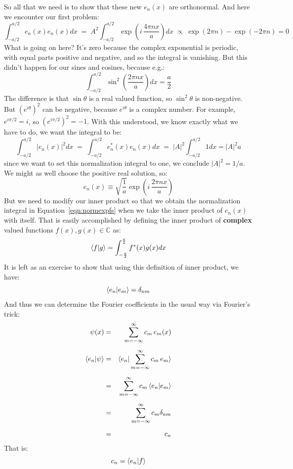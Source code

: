 \documentclass[12pt]{book}
\begin{document}
So all that we need is to show that these new $e_n(x)$ are orthonormal.  And here we encounter our first problem:
$$\int_{-a/2}^{a/2} e_n(x) e_n(x) dx \; = \; A^2 \int_{-a/2}^{a/2} \exp\left( i \, \frac{4 \pi n x}{a}\right) dx \; \propto \; \exp(2 \pi n) - \exp(-2 \pi n) = 0$$
What is going on here?  It's zero because the complex exponential is periodic, with equal parts positive and negative, and so the integral is vanishing.  But this didn't happen for our sines and cosines, because e.g.:
$$\int_{-a/2}^{a/2} \sin^2\left( \frac{2 \pi n x}{a}\right) dx = \frac{a}{2}$$
The difference is that $\sin\theta$ is a real valued function, so $\sin^2\theta$ is non-negative.  But $(e^{i\theta})^2$ can be negative, because $e^{i\theta}$ is a complex number. For example, $e^{i\pi/2} = i$, so $\left( e^{i\pi/2} \right)^2 = -1$.  With this understood, we know exactly what we have to do, we want the integral to be:
\begin{equation}
\label{eqn:normexpfs}
\int_{-a/2}^{a/2} |e_n(x)|^2 dx \; = \; \int_{-a/2}^{a/2} e_n^*(x) e_n(x) dx \; = \;
|A|^2 \int_{-a/2}^{a/2} 1 dx = |A|^2 a
\end{equation}
since we want to set this normalization integral to one, we conclude $|A|^2=1/a$.  We might as well choose the positive real solution, so:
\begin{equation}
e_n(x) \equiv \sqrt{\frac{1}{a}} \exp\left( i \, \frac{2 \pi n x}{a}\right)
\end{equation}
But we need to modify our inner product so that we obtain the normalization integral in Equation~\ref{eqn:normexpfs} when we take the inner product of $e_n(x)$ with itself.  That is easily accomplished by defining the inner product of {\bf complex} valued functions $f(x), g(x) \in \mathbb{C}$ as:
\begin{equation}
\label{eqn:compips}
\braket{f|g} = \int_{-\frac{a}{2}}^{\frac{a}{2}} f^*(x) g(x) dx
\end{equation}
It is left as an exercise to show that using this definition of inner product, we have:
\begin{equation}
\braket{e_n|e_m} = \delta_{nm}
\end{equation}
And thus we can determine the Fourier coefficients in the usual way via Fourier's trick:
\begin{eqnarray*}
\psi(x) &=& \sum_{m=-\infty}^{\infty}  c_m \, e_m(x) \\[5pt]
\braket{e_n|\psi} &=& \braket{e_n | \sum_{m=-\infty}^{\infty}  c_m \, e_m } \\[5pt]
 &=& \sum_{m=-\infty}^{\infty}  c_m \braket{e_n| e_m}\\[5pt]
 &=& \sum_{m=-\infty}^{\infty}  c_m \delta_{nm}\\[5pt]
 &=& c_n\\
\end{eqnarray*}
That is:
\begin{equation}
\label{eqn:cofscfs}
c_n = \braket{e_n|f}
\end{equation}
\end{document}

